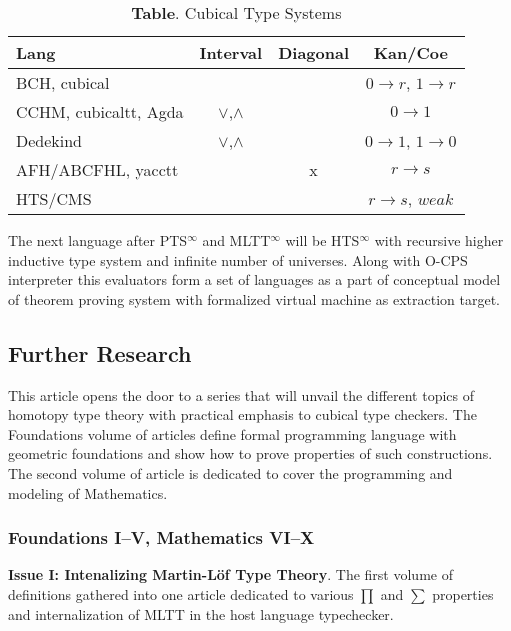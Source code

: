 \documentclass[twocolumn,10pt]{article}
\theoremstyle{definition}
\begin{document}
\begin{table}[!ht]
  \centering
  \caption*{\textbf{Table}. Cubical Type Systems}
  \begin{adjustbox}{width=\columnwidth,center}
  \begin{tabular}{lccc}
    \hline
       Lang & Interval & Diagonal & Kan/Coe\\
    \hline
       BCH, cubical        & & & $0\rightarrow r$, $1 \rightarrow r$\\
       CCHM, cubicaltt, Agda       & $\lor$,$\land$ & & $0 \rightarrow 1$\\
       Dedekind          & $\lor$,$\land$ & & $0 \rightarrow 1$, $1 \rightarrow 0$\\
       AFH/ABCFHL, yacctt & & x & $r \rightarrow s$\\
       HTS/CMS    & &   & $r \rightarrow s$, $weak$\\
  \end{tabular}
  \end{adjustbox}
\end{table}

The next language after PTS$^{\infty}$ and MLTT$^{\infty}$ will
be HTS$^{\infty}$ with recursive higher inductive type system and infinite number of universes.
Along with O-CPS interpreter this evaluators form a set of languages as a part of conceptual model of theorem
proving system with formalized virtual machine as extraction target.

\subsection*{Further Research}

This article opens the door to a series that will unvail the different topics of
homotopy type theory with practical emphasis to cubical type checkers.
The Foundations volume of articles define formal programming language
with geometric foundations and show how to prove properties of such constructions.
The second volume of article is dedicated to cover the programming and modeling of Mathematics.

\subsubsection*{\hspace{0.5cm}Foundations I--V, Mathematics VI--X}

\hspace{0.4cm} {\bf Issue I: Intenalizing Martin-Löf Type Theory}.
The first volume of definitions gathered into one article dedicated to
various $\prod$ and $\sum$ properties and internalization of MLTT in the host language typechecker.
\end{document}
